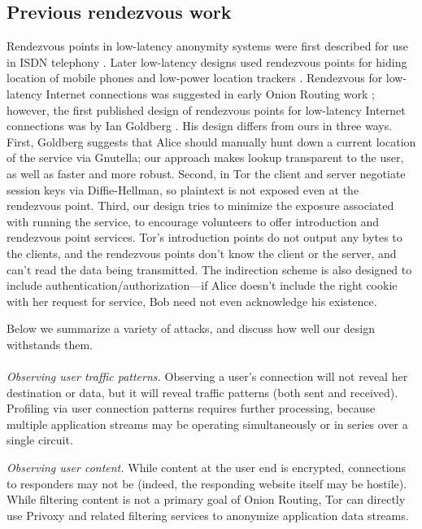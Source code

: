 \documentclass[times,10pt,twocolumn]{article}
\begin{document}
\subsection{Previous rendezvous work}

Rendezvous points in low-latency anonymity systems were first
described for use in ISDN telephony \cite{isdn-mixes,jerichow-jsac98}.
Later low-latency designs used rendezvous points for hiding location
of mobile phones and low-power location trackers
\cite{federrath-ih96,reed-protocols97}.  Rendezvous for low-latency
Internet connections was suggested in early Onion Routing work
\cite{or-ih96}; however, the first published design of rendezvous
points for low-latency Internet connections was by Ian Goldberg
\cite{ian-thesis}. His design differs from
ours in three ways. First, Goldberg suggests that Alice should manually
hunt down a current location of the service via Gnutella; our approach
makes lookup transparent to the user, as well as faster and more robust.
Second, in Tor the client and server negotiate session keys
via Diffie-Hellman, so plaintext is not exposed even at the rendezvous point. Third,
our design tries to minimize the exposure associated with running the
service, to encourage volunteers to offer introduction and rendezvous
point services. Tor's introduction points do not output any bytes to the
clients, and the rendezvous points don't know the client or the server,
and can't read the data being transmitted. The indirection scheme is
also designed to include authentication/authorization---if Alice doesn't
include the right cookie with her request for service, Bob need not even
acknowledge his existence.

\label{sec:attacks}

Below we summarize a variety of attacks, and discuss how well our
design withstands them.\\

\\
\emph{Observing user traffic patterns.} Observing a user's connection
will not reveal her destination or data, but it will
reveal traffic patterns (both sent and received). Profiling via user
connection patterns requires further processing, because multiple
application streams may be operating simultaneously or in series over
a single circuit.

\emph{Observing user content.} While content at the user end is encrypted,
connections to responders may not be (indeed, the responding website
itself may be hostile). While filtering content is not a primary goal
of Onion Routing, Tor can directly use Privoxy and related
filtering services to anonymize application data streams.
\end{document}
